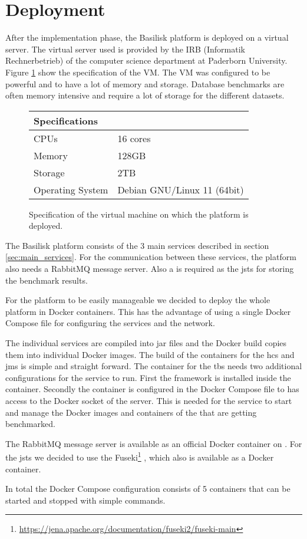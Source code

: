 \section{Deployment}
\label{sec:deployment}
After the implementation phase, the Basilisk platform is deployed on a virtual server.
The virtual server used is provided by the IRB (Informatik Rechnerbetrieb) of the computer science department at Paderborn University.
Figure \ref{fig:vm_specs} show the specification of the VM.
The VM was configured to be powerful and to have a lot of memory and storage.
Database benchmarks are often memory intensive and require a lot of storage for the different datasets.

\begin{figure}[tbph]
	\centering
	\begin{tabular}{ll}
		\toprule
		\textbf{Specifications} &                             \\ \midrule
		CPUs                    & 16 cores                    \\ \midrule
		Memory                  & 128GB                       \\ \midrule
		Storage                 & 2TB                         \\ \midrule
		Operating System        & Debian GNU/Linux 11 (64bit) \\ \bottomrule
	\end{tabular}
	\caption{Specification of the virtual machine on which the platform is deployed.}
	\label{fig:vm_specs}
\end{figure}

The Basilisk platform consists of the 3 main services described in section \ref{sec:main_services}.
For the communication between these services, the platform also needs a RabbitMQ message server.
Also a \ts{} is required as the \acl{jsts} for storing the benchmark results.

For the platform to be easily manageable we decided to deploy the whole platform in Docker containers.
This has the advantage of using a single Docker Compose file for configuring the services and the network.

The individual services are compiled into jar files and the Docker build copies them into individual Docker images.
The build of the containers for the \ac{hcs} and \ac{jms} is simple and straight forward.
The container for the \ac{tbs} needs two additional configurations for the service to run.
First the \iguana{} framework is installed inside the container.
Secondly the container is configured in the Docker Compose file to has access to the Docker socket of the server.
This is needed for the service to start and manage the Docker images and containers of the \tsp{} that are getting benchmarked.

The RabbitMQ message server is available as an official Docker container on \dockh{}.
For the \ac{jsts} we decided to use the Fuseki\footnote{\url{https://jena.apache.org/documentation/fuseki2/fuseki-main}} \ts{}, which also is available as a Docker container.

In total the Docker Compose configuration consists of 5 containers that can be started and stopped with simple commands.